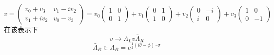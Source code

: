\begin{equation}
v=\left(\begin{array}{cc}
v_{0}+v_{3} & v_{1}-i v_{2} \\
v_{1}+i v_{2} & v_{0}-v_{3}
\end{array}\right)=v_{0}\left(\begin{array}{cc}
1 & 0 \\
0 & 1
\end{array}\right)+v_{1}\left(\begin{array}{cc}
0 & 1 \\
1 & 0
\end{array}\right)+v_{2}\left(\begin{array}{cc}
0 & -i \\
i & 0
\end{array}\right)+v_{3}\left(\begin{array}{cc}
1 & 0 \\
0 & -1
\end{array}\right)
\end{equation}
在该表示下
\begin{equation}
v\rightarrow\Lambda_{L}v \bar{\Lambda}_{R}
\end{equation}
\begin{equation}
\bar{\Lambda}_{R}\in\Lambda_{R}=e^{\frac{1}{2}(i \theta-\phi) \cdot \sigma}
\end{equation}
